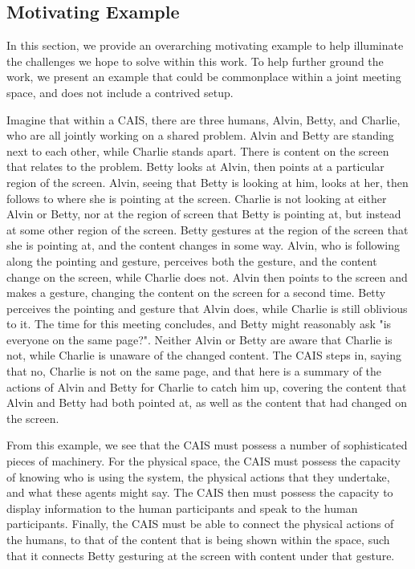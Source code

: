 \subsection{Motivating Example}

In this section, we provide an overarching motivating example to help
illuminate the challenges we hope to solve within this work. To help further
ground the work, we present an example that could be commonplace within a joint
meeting space, and does not include a contrived setup.

Imagine that within a CAIS, there are three humans, Alvin, Betty, and Charlie,
who are all jointly working on a shared problem. Alvin and Betty are standing
next to each other, while Charlie stands apart. There is content on the screen
that relates to the problem. Betty looks at Alvin, then points at a particular
region of the screen. Alvin, seeing that Betty is looking at him, looks at her,
then follows to where she is pointing at the screen. Charlie is not looking at
either Alvin or Betty, nor at the region of screen that Betty is pointing at,
but instead at some other region of the screen. Betty gestures at the region of
the screen that she is pointing at, and the content changes in some way. Alvin,
who is following along the pointing and gesture, perceives both the gesture, and
the content change on the screen, while Charlie does not. Alvin then points to
the screen and makes a gesture, changing the content on the screen for a second
time. Betty perceives the pointing and gesture that Alvin does, while Charlie is
still oblivious to it. The time for this meeting concludes, and Betty might
reasonably ask "is everyone on the same page?". Neither Alvin or Betty are aware
that Charlie is not, while Charlie is unaware of the changed content. The
CAIS steps in, saying that no, Charlie is not on the same page, and that here
is a summary of the actions of Alvin and Betty for Charlie to catch him up,
covering the content that Alvin and Betty had both pointed at, as well as
the content that had changed on the screen.

From this example, we see that the CAIS must possess a number of sophisticated
pieces of machinery. For the physical space, the CAIS must possess the capacity
of knowing who is using the system, the physical actions that they
undertake, and what these agents might say. The CAIS then must possess the
capacity to display information to the human participants and speak to the
human participants. Finally, the CAIS must be able to connect the physical
actions of the humans, to that of the content that is being shown within the
space, such that it connects Betty gesturing at the screen with content under
that gesture.

